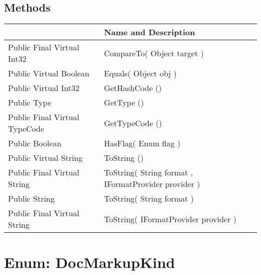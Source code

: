 \documentclass[11pt, oneside, a4paper]{book}
\begin{document}
\subsection{Methods}
\begin{center}
\begin{tabular}{| p{3cm} | p{12cm} | }
\hline
\textbf{ } & \textbf{ Name and Description}\\
\hline
 Public  Final  Virtual  Int32 &  CompareTo(\hypertarget{SoftwareEngineeringTools.{}Documentation.{}DocKind.{}CompareTo\_Object}{} Object  target  )\\
\hline
 Public  Virtual  Boolean &  Equals(\hypertarget{SoftwareEngineeringTools.{}Documentation.{}DocKind.{}Equals\_Object}{} Object  obj  )\\
\hline
 Public  Virtual  Int32 &  GetHashCode ()\hypertarget{SoftwareEngineeringTools.{}Documentation.{}DocKind.{}GetHashCode}{}\\
\hline
 Public  Type &  GetType ()\hypertarget{SoftwareEngineeringTools.{}Documentation.{}DocKind.{}GetType}{}\\
\hline
 Public  Final  Virtual  TypeCode &  GetTypeCode ()\hypertarget{SoftwareEngineeringTools.{}Documentation.{}DocKind.{}GetTypeCode}{}\\
\hline
 Public  Boolean &  HasFlag(\hypertarget{SoftwareEngineeringTools.{}Documentation.{}DocKind.{}HasFlag\_Enum}{} Enum  flag  )\\
\hline
 Public  Virtual  String &  ToString ()\hypertarget{SoftwareEngineeringTools.{}Documentation.{}DocKind.{}ToString}{}\\
\hline
 Public  Final  Virtual  String &  ToString(\hypertarget{SoftwareEngineeringTools.{}Documentation.{}DocKind.{}ToString\_String\_IFormatProvider}{} String  format  ,  IFormatProvider  provider  )\\
\hline
 Public  String &  ToString(\hypertarget{SoftwareEngineeringTools.{}Documentation.{}DocKind.{}ToString\_String}{} String  format  )\\
\hline
 Public  Final  Virtual  String &  ToString(\hypertarget{SoftwareEngineeringTools.{}Documentation.{}DocKind.{}ToString\_IFormatProvider}{} IFormatProvider  provider  )\\
\hline
\end{tabular}
\end{center}
 


\hypertarget{SoftwareEngineeringTools.{}Documentation.{}DocMarkupKind}{}
\section{Enum: DocMarkupKind}
\end{document}
